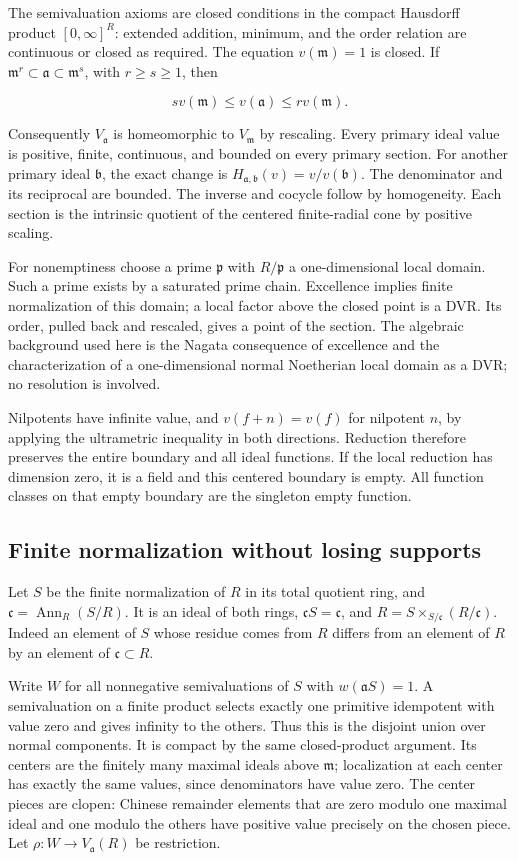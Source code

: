\documentclass[11pt]{article}
\begin{document}
The semivaluation axioms are closed conditions in the compact Hausdorff product $[0,\infty]^R$: extended addition, minimum, and the order relation are continuous or closed as required. The equation $v(\mathfrak m)=1$ is closed. If $\mathfrak m^r\subset\mathfrak a\subset\mathfrak m^s$, with $r\ge s\ge1$, then

\[
s v(\mathfrak m)\le v(\mathfrak a)\le r v(\mathfrak m).
\]

Consequently $V_{\mathfrak a}$ is homeomorphic to $V_{\mathfrak m}$ by rescaling. Every primary ideal value is positive, finite, continuous, and bounded on every primary section. For another primary ideal $\mathfrak b$, the exact change is $H_{\mathfrak a,\mathfrak b}(v)=v/v(\mathfrak b)$. The denominator and its reciprocal are bounded. The inverse and cocycle follow by homogeneity. Each section is the intrinsic quotient of the centered finite-radial cone by positive scaling.

For nonemptiness choose a prime $\mathfrak p$ with $R/\mathfrak p$ a one-dimensional local domain. Such a prime exists by a saturated prime chain. Excellence implies finite normalization of this domain; a local factor above the closed point is a DVR. Its order, pulled back and rescaled, gives a point of the section. The algebraic background used here is the Nagata consequence of excellence and the characterization of a one-dimensional normal Noetherian local domain as a DVR; no resolution is involved.

Nilpotents have infinite value, and $v(f+n)=v(f)$ for nilpotent $n$, by applying the ultrametric inequality in both directions. Reduction therefore preserves the entire boundary and all ideal functions. If the local reduction has dimension zero, it is a field and this centered boundary is empty. All function classes on that empty boundary are the singleton empty function.

\subsection{Finite normalization without losing supports}

Let $S$ be the finite normalization of $R$ in its total quotient ring, and $\mathfrak c=\operatorname{Ann}_R(S/R)$. It is an ideal of both rings, $\mathfrak cS=\mathfrak c$, and $R=S\times_{S/\mathfrak c}(R/\mathfrak c)$. Indeed an element of $S$ whose residue comes from $R$ differs from an element of $R$ by an element of $\mathfrak c\subset R$.

Write $W$ for all nonnegative semivaluations of $S$ with $w(\mathfrak aS)=1$. A semivaluation on a finite product selects exactly one primitive idempotent with value zero and gives infinity to the others. Thus this is the disjoint union over normal components. It is compact by the same closed-product argument. Its centers are the finitely many maximal ideals above $\mathfrak m$; localization at each center has exactly the same values, since denominators have value zero. The center pieces are clopen: Chinese remainder elements that are zero modulo one maximal ideal and one modulo the others have positive value precisely on the chosen piece. Let $\rho:W\longrightarrow V_{\mathfrak a}(R)$ be restriction.
\end{document}
